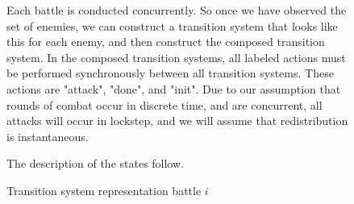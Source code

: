 \documentclass[11pt]{article}
\theoremstyle{definition}
\begin{document}
\begin{figure}
    \caption{Transition system representation battle $ i $}
    \label{tikz:battle}
    \centering
    \small
    \justify
    \par
    Each battle is conducted concurrently. So once we
    have observed the set of enemies, we can construct
    a transition system that looks like this for each enemy,
    and then construct the composed transition system.
    In the composed transition systems, all labeled actions
    must be performed synchronously between all
    transition systems. These actions are "attack", "done", and "init".
    Due to our assumption that rounds of combat
    occur in discrete time, and are concurrent,
    all attacks will occur in lockstep, and
    we will assume that redistribution is instantaneous.

    The description of the states follow.


\end{figure}
\end{document}
